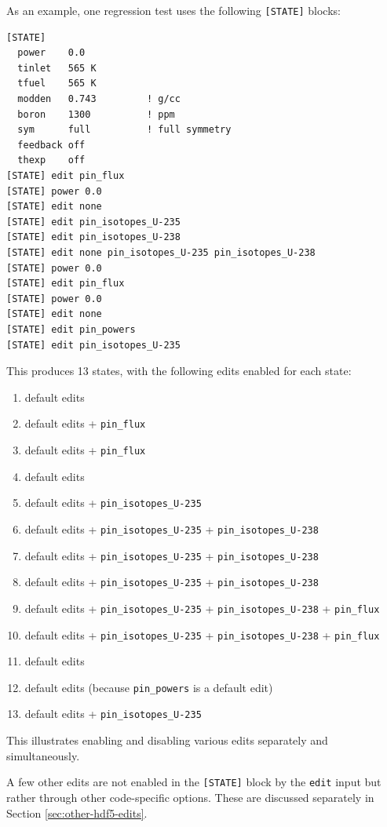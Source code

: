 As an example, one regression test uses the following \texttt{[STATE]} blocks:
\begin{verbatim}
[STATE]
  power    0.0
  tinlet   565 K
  tfuel    565 K
  modden   0.743         ! g/cc
  boron    1300          ! ppm
  sym      full          ! full symmetry
  feedback off
  thexp    off
[STATE] edit pin_flux
[STATE] power 0.0
[STATE] edit none
[STATE] edit pin_isotopes_U-235
[STATE] edit pin_isotopes_U-238
[STATE] edit none pin_isotopes_U-235 pin_isotopes_U-238
[STATE] power 0.0
[STATE] edit pin_flux
[STATE] power 0.0
[STATE] edit none
[STATE] edit pin_powers
[STATE] edit pin_isotopes_U-235
\end{verbatim}
This produces 13 states, with the following edits enabled for each state:
\begin{enumerate}[noitemsep]
    \item default edits
    \item default edits + \texttt{pin\_flux}
    \item default edits + \texttt{pin\_flux}
    \item default edits
    \item default edits + \texttt{pin\_isotopes\_U-235}
    \item default edits + \texttt{pin\_isotopes\_U-235} + \texttt{pin\_isotopes\_U-238}
    \item default edits + \texttt{pin\_isotopes\_U-235} + \texttt{pin\_isotopes\_U-238}
    \item default edits + \texttt{pin\_isotopes\_U-235} + \texttt{pin\_isotopes\_U-238}
    \item default edits + \texttt{pin\_isotopes\_U-235} + \texttt{pin\_isotopes\_U-238} + \texttt{pin\_flux}
    \item default edits + \texttt{pin\_isotopes\_U-235} + \texttt{pin\_isotopes\_U-238} + \texttt{pin\_flux}
    \item default edits
    \item default edits (because \texttt{pin\_powers} is a default edit)
    \item default edits + \texttt{pin\_isotopes\_U-235}
\end{enumerate}
This illustrates enabling and disabling various edits separately and simultaneously.

A few other edits are not enabled in the \texttt{[STATE]} block by the \texttt{edit} input but rather through other code-specific options.  These are discussed separately in Section \ref{sec:other-hdf5-edits}.

